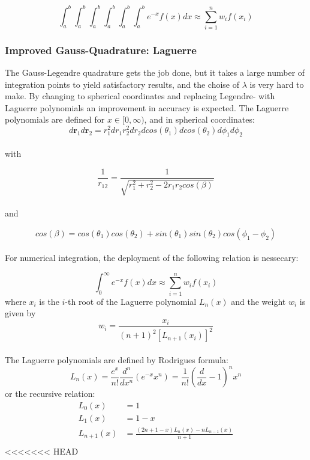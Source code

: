 \documentclass[../main.tex]{subfiles}
\begin{document}
\[\int_a^b\int_a^b\int_a^b\int_a^b\int_a^b\int_a^b e^{-x}f(x)dx \approx \sum_{i=1}^n w_i f(x_i)\]

\subsubsection{Improved Gauss-Quadrature: Laguerre} \label{sec:improved_GQ}
The Gauss-Legendre quadrature gets the job done, but it takes a large number of integration points to yield satisfactory results, and the choise of $\lambda$ is very hard to make. By changing to spherical coordinates and replacing Legendre- with Laguerre polynomials an improvement in accuracy is expected. The Laguerre polynomials are defined for  $x \in [0, \infty)$, and in spherical coordinates:
\\

\begin{equation}
  d\mathbf{r}_1 d\mathbf{r}_2 = r_1^2 dr_1 r_2^2 dr_2 dcos(\theta_1) dcos(\theta_2) d\phi_1 d\phi_2
  \label{eq:sphere-cord1}
\end{equation}
\\
with

\begin{equation}
  \frac{1}{r_{12}} = \frac{1}{\sqrt{r_1^2 + r_2^2 - 2r_1r_2cos(\beta)}}
  \label{eq:sphere-cord2}
\end{equation}
\\and

\begin{equation}
  cos(\beta) = cos(\theta_1)cos(\theta_2) + sin(\theta_1)sin(\theta_2)cos(\phi_1 - \phi_2)
  \label{eq:sphere-cord3}
\end{equation}
\\

For numerical integration, the deployment of the following relation is nessecary:

\[\int_0^\infty e^{-x}f(x)dx \approx \sum_{i=1}^n w_i f(x_i)\]
where $x_i$ is the $i$-th root of the Laguerre polynomial $L_n(x)$ and the weight $w_i$ is given by
\\
\[w_i = \frac{x_i}{(n+1)^2 [L_{n+1}(x_i)]^2}\]
\\
The Laguerre polynomials are defined by Rodrigues formula:
\[L_n(x) = \frac{e^x}{n!}\frac{d^n}{dx^n}\left(e^{-x} x^n\right) = \frac{1}{n!}\left(\frac{d}{dx}-1\right)^n x^n\]
or the recursive relation:
\begin{align*}
  L_0(x) &= 1\\
  L_1(x) &= 1 - x\\
  L_{n+1}(x) &= \frac{(2n + 1 - x)L_n(x) - nL_{n-1}(x)}{n+1}\\
\end{align*}
<<<<<<< HEAD
\end{document}
